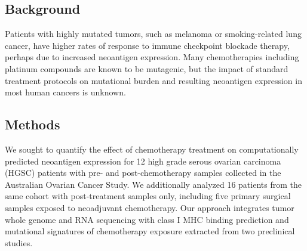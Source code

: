 \subsection*{Background}
Patients with highly mutated tumors, such as melanoma or smoking-related lung cancer, have higher rates of response to immune checkpoint blockade therapy, perhaps due to increased neoantigen expression. Many chemotherapies including platinum compounds are known to be mutagenic, but the impact of standard treatment protocols on mutational burden and resulting neoantigen expression in most human cancers is unknown.


\subsection*{Methods}

We sought to quantify the effect of chemotherapy treatment on computationally predicted neoantigen expression for 12 high grade serous ovarian carcinoma (HGSC) patients with pre- and post-chemotherapy samples collected in the Australian Ovarian Cancer Study. We additionally analyzed 16 patients from the same cohort with post-treatment samples only, including five primary surgical samples exposed to neoadjuvant chemotherapy. Our approach integrates tumor whole genome and RNA sequencing with class I MHC binding prediction and mutational signatures of chemotherapy exposure extracted from two preclinical studies.




